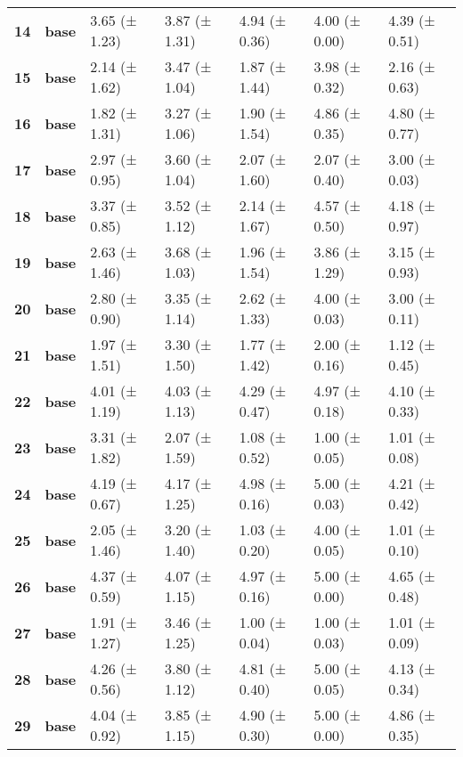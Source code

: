 \begin{longtable}{lllllll}
\cline{1-7}
\textbf{14} & \textbf{base} & 3.65 (± 1.23) & 3.87 (± 1.31) & 4.94 (± 0.36) & 4.00 (± 0.00) & 4.39 (± 0.51) \\
\cline{1-7}
\textbf{15} & \textbf{base} & 2.14 (± 1.62) & 3.47 (± 1.04) & 1.87 (± 1.44) & 3.98 (± 0.32) & 2.16 (± 0.63) \\
\cline{1-7}
\textbf{16} & \textbf{base} & 1.82 (± 1.31) & 3.27 (± 1.06) & 1.90 (± 1.54) & 4.86 (± 0.35) & 4.80 (± 0.77) \\
\cline{1-7}
\textbf{17} & \textbf{base} & 2.97 (± 0.95) & 3.60 (± 1.04) & 2.07 (± 1.60) & 2.07 (± 0.40) & 3.00 (± 0.03) \\
\cline{1-7}
\textbf{18} & \textbf{base} & 3.37 (± 0.85) & 3.52 (± 1.12) & 2.14 (± 1.67) & 4.57 (± 0.50) & 4.18 (± 0.97) \\
\cline{1-7}
\textbf{19} & \textbf{base} & 2.63 (± 1.46) & 3.68 (± 1.03) & 1.96 (± 1.54) & 3.86 (± 1.29) & 3.15 (± 0.93) \\
\cline{1-7}
\textbf{20} & \textbf{base} & 2.80 (± 0.90) & 3.35 (± 1.14) & 2.62 (± 1.33) & 4.00 (± 0.03) & 3.00 (± 0.11) \\
\cline{1-7}
\textbf{21} & \textbf{base} & 1.97 (± 1.51) & 3.30 (± 1.50) & 1.77 (± 1.42) & 2.00 (± 0.16) & 1.12 (± 0.45) \\
\cline{1-7}
\textbf{22} & \textbf{base} & 4.01 (± 1.19) & 4.03 (± 1.13) & 4.29 (± 0.47) & 4.97 (± 0.18) & 4.10 (± 0.33) \\
\cline{1-7}
\textbf{23} & \textbf{base} & 3.31 (± 1.82) & 2.07 (± 1.59) & 1.08 (± 0.52) & 1.00 (± 0.05) & 1.01 (± 0.08) \\
\cline{1-7}
\textbf{24} & \textbf{base} & 4.19 (± 0.67) & 4.17 (± 1.25) & 4.98 (± 0.16) & 5.00 (± 0.03) & 4.21 (± 0.42) \\
\cline{1-7}
\textbf{25} & \textbf{base} & 2.05 (± 1.46) & 3.20 (± 1.40) & 1.03 (± 0.20) & 4.00 (± 0.05) & 1.01 (± 0.10) \\
\cline{1-7}
\textbf{26} & \textbf{base} & 4.37 (± 0.59) & 4.07 (± 1.15) & 4.97 (± 0.16) & 5.00 (± 0.00) & 4.65 (± 0.48) \\
\cline{1-7}
\textbf{27} & \textbf{base} & 1.91 (± 1.27) & 3.46 (± 1.25) & 1.00 (± 0.04) & 1.00 (± 0.03) & 1.01 (± 0.09) \\
\cline{1-7}
\textbf{28} & \textbf{base} & 4.26 (± 0.56) & 3.80 (± 1.12) & 4.81 (± 0.40) & 5.00 (± 0.05) & 4.13 (± 0.34) \\
\cline{1-7}
\textbf{29} & \textbf{base} & 4.04 (± 0.92) & 3.85 (± 1.15) & 4.90 (± 0.30) & 5.00 (± 0.00) & 4.86 (± 0.35) \\

\end{longtable}
